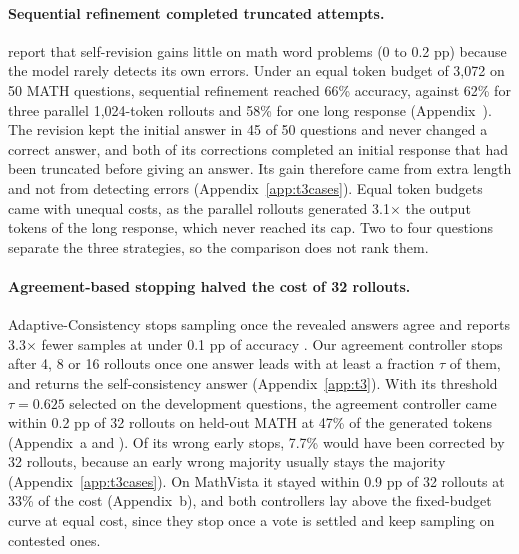 \documentclass{article}
\newcommand{\tablebody}[1]{\small\setlength{\tabcolsep}{4pt}}
\begin{document}
\begin{table}[t]
  \centering
  \caption{Held-out accuracy (\%) at 8 and 32 rollouts, and the difference from self-consistency at 32 with a 95\% paired bootstrap interval.}
  \label{tab:t3}
  \tablebody{tables/t3_methods.tex}
\end{table}

\paragraph{Sequential refinement completed truncated attempts.}
\citet{selfrefine} report that self-revision gains little on math word problems (0 to 0.2 pp) because the model rarely detects its own errors. Under an equal token budget of 3,072 on 50 MATH questions, sequential refinement reached 66\% accuracy, against 62\% for three parallel 1,024-token rollouts and 58\% for one long response (Appendix~). The revision kept the initial answer in 45 of 50 questions and never changed a correct answer, and both of its corrections completed an initial response that had been truncated before giving an answer. Its gain therefore came from extra length and not from detecting errors (Appendix~\ref{app:t3cases}). Equal token budgets came with unequal costs, as the parallel rollouts generated 3.1$\times$ the output tokens of the long response, which never reached its cap. Two to four questions separate the three strategies, so the comparison does not rank them.

\paragraph{Agreement-based stopping halved the cost of 32 rollouts.}
Adaptive-Consistency stops sampling once the revealed answers agree and reports 3.3$\times$ fewer samples at under 0.1 pp of accuracy \citep{adaptiveconsistency}. Our agreement controller stops after 4, 8 or 16 rollouts once one answer leads with at least a fraction $\tau$ of them, and returns the self-consistency answer (Appendix~\ref{app:t3}). With its threshold $\tau=0.625$ selected on the development questions, the agreement controller came within 0.2 pp of 32 rollouts on held-out MATH at 47\% of the generated tokens (Appendix~a and ). Of its wrong early stops, 7.7\% would have been corrected by 32 rollouts, because an early wrong majority usually stays the majority (Appendix~\ref{app:t3cases}). On MathVista it stayed within 0.9 pp of 32 rollouts at 33\% of the cost (Appendix~b), and both controllers lay above the fixed-budget curve at equal cost, since they stop once a vote is settled and keep sampling on contested ones.
\end{document}

